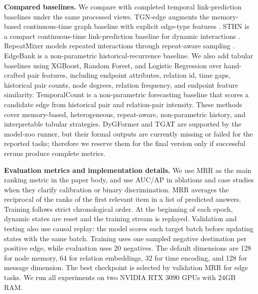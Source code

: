 \noindent\textbf{Compared baselines.}
We compare with completed temporal link-prediction baselines under the same processed views. 
TGN-edge augments the memory-based continuous-time graph baseline \cite{rossi2020tgn} with explicit edge-type features \cite{gastinger2024tgb2}. 
STHN is a compact continuous-time link-prediction baseline for dynamic interactions \cite{li2023sthn}. 
RepeatMixer models repeated interactions through repeat-aware sampling \cite{zou2024repeatmixer}. 
EdgeBank is a non-parametric historical-recurrence baseline. 
We also add tabular baselines using XGBoost, Random Forest, and Logistic Regression over hand-crafted pair features, including endpoint attributes, relation id, time gaps, historical pair counts, node degrees, relation frequency, and endpoint feature similarity. 
TemporalCount is a non-parametric forecasting baseline that scores a candidate edge from historical pair and relation-pair intensity. 
These methods cover memory-based, heterogeneous, repeat-aware, non-parametric history, and interpretable tabular strategies.
DyGFormer and TGAT are supported by the model-zoo runner, but their formal outputs are currently missing or failed for the reported tasks; therefore we reserve them for the final version only if successful reruns produce complete metrics.

\noindent\textbf{Evaluation metrics and implementation details.}
We use MRR as the main ranking metric in the paper body, and use AUC/AP in ablations and case studies when they clarify calibration or binary discrimination. 
MRR averages the reciprocal of the ranks of the first relevant item in a list of predicted answers. Training follows strict chronological order. At the beginning of each epoch, 
dynamic states are reset and the training stream is replayed.
 Validation and testing also use causal replay: 
 the model scores each target batch before updating states with the same batch. 
 Training uses one sampled negative destination per positive edge, 
 while evaluation uses 20 negatives. The default dimensions are 128 for node memory, 
 64 for relation embeddings, 32 for time encoding, 
 and 128 for message dimension. The best checkpoint is selected by validation MRR for edge tasks.
 We run all experiments on two NVIDIA RTX 3090 GPUs with 24GB RAM.

